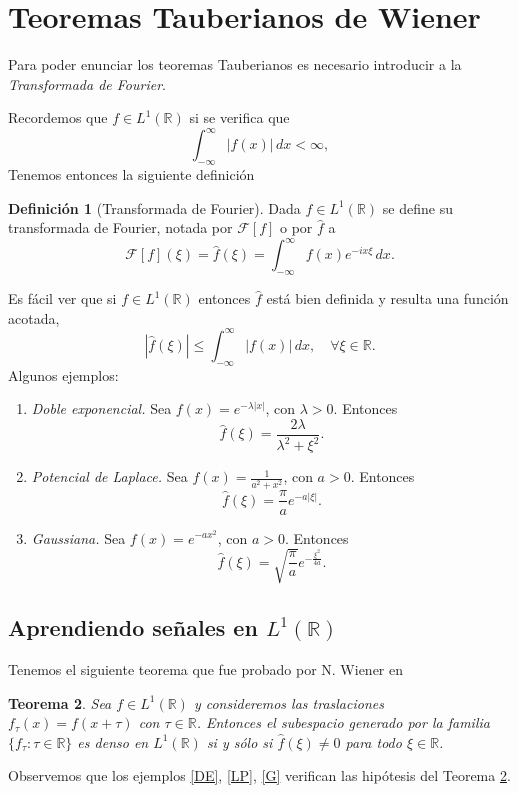 \documentclass[12pt, a4paper]{amsbook}
\newcommand{\R}{{\mathbb R}}
\newcommand{\F}{{\mathcal F}}
\newtheorem{teo}{Teorema}[section]
\theoremstyle{remark}
\theoremstyle{definition}
\newtheorem{defi}[teo]{Definici\'on}
\numberwithin{section}{chapter}
\numberwithin{subsection}{section}
\numberwithin{equation}{section}
\numberwithin{figure}{chapter}
\begin{document}
\section{Teoremas Tauberianos de Wiener}\label{sec.c7.4}

Para poder enunciar los teoremas Tauberianos es necesario introducir a la {\em Transformada de Fourier}.

Recordemos que $f\in L^1(\R)$ si se verifica que
$$
\int_{-\infty}^\infty |f(x)|\, dx < \infty,
$$
Tenemos entonces la siguiente definición
\begin{defi}[Transformada de Fourier]\label{def.fourier}
Dada $f\in L^1(\R)$ se define su transformada de Fourier, notada por $\F[f]$ o por $\hat f$ a
$$
\F[f](\xi) = \hat f(\xi) = \int_{-\infty}^\infty f(x) e^{-i x\xi}\, dx.
$$
\end{defi}
Es fácil ver que si $f\in L^1(\R)$ entonces $\hat f$ está bien definida y resulta una función acotada,
$$
|\hat f(\xi)|\le \int_{-\infty}^\infty |f(x)|\, dx,\quad \forall \xi\in\R.
$$
Algunos ejemplos:
\begin{enumerate}
\item \label{DE}{\em Doble exponencial.} Sea $f(x)=e^{-\lambda|x|}$, con $\lambda>0$. Entonces
$$
\hat f(\xi) = \frac{2\lambda}{\lambda^2 + \xi^2}.
$$

\item \label{LP} {\em Potencial de Laplace.} Sea $f(x) = \frac{1}{a^2+x^2}$, con $a>0$. Entonces
$$
\hat f(\xi) = \frac{\pi}{a} e^{-a|\xi|}.
$$

\item \label{G} {\em Gaussiana.} Sea $f(x) = e^{-ax^2}$, con $a>0$. Entonces
$$
\hat f(\xi) = \sqrt{\frac{\pi}{a}} e^{-\frac{\xi^2}{4a}}.
$$
\end{enumerate}

\subsection{Aprendiendo señales en $L^1(\R)$}
Tenemos el siguiente teorema que fue probado por N. Wiener en \cite{Wiener}
\begin{teo}\label{teo.wiener1}
Sea $f\in L^1(\R)$ y consideremos las traslaciones $f_\tau(x) = f(x+\tau)$ con $\tau\in\R$. Entonces el subespacio generado por la familia $\{f_\tau\colon \tau\in\R\}$ es denso en $L^1(\R)$ si y sólo si $\hat f(\xi)\neq 0$ para todo $\xi\in\R$.
\end{teo}

Observemos que los ejemplos \ref{DE}, \ref{LP}, \ref{G} verifican las hipótesis del Teorema \ref{teo.wiener1}.
\end{document}
